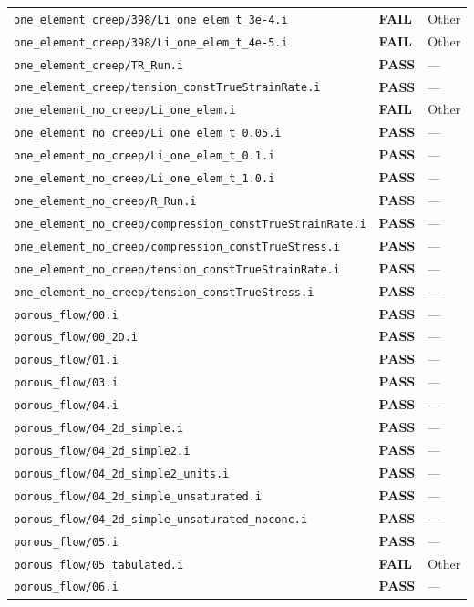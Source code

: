 \documentclass[10pt,letterpaper]{article}
\newcommand{\PASS}{\textcolor{passgreen}{\textbf{PASS}}}
\newcommand{\FAIL}{\textcolor{failred}{\textbf{FAIL}}}
\newcommand{\code}[1]{\texttt{\small #1}}
\begin{document}
\begin{longtable}{p{} l p{}}
\code{one\_element\_creep/398/Li\_one\_elem\_t\_3e-4.i} & \FAIL & Other \\
\code{one\_element\_creep/398/Li\_one\_elem\_t\_4e-5.i} & \FAIL & Other \\
\code{one\_element\_creep/TR\_Run.i} & \PASS & --- \\
\code{one\_element\_creep/tension\_constTrueStrainRate.i} & \PASS & --- \\
\code{one\_element\_no\_creep/Li\_one\_elem.i} & \FAIL & Other \\
\code{one\_element\_no\_creep/Li\_one\_elem\_t\_0.05.i} & \PASS & --- \\
\code{one\_element\_no\_creep/Li\_one\_elem\_t\_0.1.i} & \PASS & --- \\
\code{one\_element\_no\_creep/Li\_one\_elem\_t\_1.0.i} & \PASS & --- \\
\code{one\_element\_no\_creep/R\_Run.i} & \PASS & --- \\
\code{one\_element\_no\_creep/compression\_constTrueStrainRate.i} & \PASS & --- \\
\code{one\_element\_no\_creep/compression\_constTrueStress.i} & \PASS & --- \\
\code{one\_element\_no\_creep/tension\_constTrueStrainRate.i} & \PASS & --- \\
\code{one\_element\_no\_creep/tension\_constTrueStress.i} & \PASS & --- \\
\code{porous\_flow/00.i} & \PASS & --- \\
\code{porous\_flow/00\_2D.i} & \PASS & --- \\
\code{porous\_flow/01.i} & \PASS & --- \\
\code{porous\_flow/03.i} & \PASS & --- \\
\code{porous\_flow/04.i} & \PASS & --- \\
\code{porous\_flow/04\_2d\_simple.i} & \PASS & --- \\
\code{porous\_flow/04\_2d\_simple2.i} & \PASS & --- \\
\code{porous\_flow/04\_2d\_simple2\_units.i} & \PASS & --- \\
\code{porous\_flow/04\_2d\_simple\_unsaturated.i} & \PASS & --- \\
\code{porous\_flow/04\_2d\_simple\_unsaturated\_noconc.i} & \PASS & --- \\
\code{porous\_flow/05.i} & \PASS & --- \\
\code{porous\_flow/05\_tabulated.i} & \FAIL & Other \\
\code{porous\_flow/06.i} & \PASS & --- \\

\end{longtable}
\end{document}
